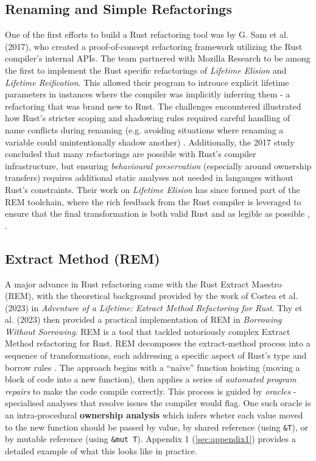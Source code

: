 \subsection{Renaming and Simple Refactorings}
One of the first efforts to build a Rust refactoring tool was by G. Sam et al.
(2017), who created a proof-of-concept refactoring framework utilizing the Rust
compiler's internal APIs. The team partnered with Mozilla Research to be among
the first to implement the Rust specific refactorings of \textit{Lifetime
Elision} and \textit{Lifetime Reification}. This allowed their program to
introuce explicit lifetime parameters in instances where the compiler was
implicitly inferring them - a refactoring that was brand new to Rust. The
challenges encountered illustrated how Rust's stricter scoping and shadowing
rules required careful handling of name conflicts during renaming (e.g. avoiding
situations where renaming a variable could unintentionally shadow another)
\cite{automated_refactoring_of_rust_programs}. Additionally, the 2017 study
concluded that many refactorings are possible with Rust's compiler
infrastructure, but ensuring \textit{behavioural preservation} (especially
around ownership transfers) requires additional static analyses not needed in
langauges without Rust's constraints. Their work on \textit{Lifetime Elision}
has since formed part of the REM toolchain, where the rich feedback from the
Rust compiler is leveraged to ensure that the final transformation is both
valid Rust and as legible as possible \cite{AdventureOfALifetime},
\cite{BorrowingWithoutSorrowing}.

\subsection{Extract Method (REM)}

A major advance in Rust refactoring came with the Rust Extract Maestro (REM),
with the theoretical background provided by the work of Costea et al. (2023) in
\textit{Adventure of a Lifetime: Extract Method Refactoring for Rust}. Thy et
al. (2023) then provided a practical implementation of REM in \textit{Borrowing
Without Sorrowing}. REM is a tool that tackled notoriously complex Extract
Method refactoring for Rust. REM decomposes the extract-method process into a
sequence of transformations, each addressing a specific aspect of Rust's type
and borrow rules \cite{AdventureOfALifetime}. The approach begins with a
``na\"ive'' function hoisting (moving a block of code into a new function), then
applies a series of \textit{automated program repairs} to make the code compile
correctly. This process is guided by \textit{oracles} - specialised analyses
that resolve issues the compiler would flag. One such oracle is an
intra-procedural \textbf{ownership analysis} which infers wheter each value
moved to the new function should be passed by value, by shared reference (using
\texttt{\&T}), or by mutable reference (using \texttt{\&mut T}). Appendix 1
(\ref{sec:appendix1}) provides a detailed example of what this looks like in
practice.
